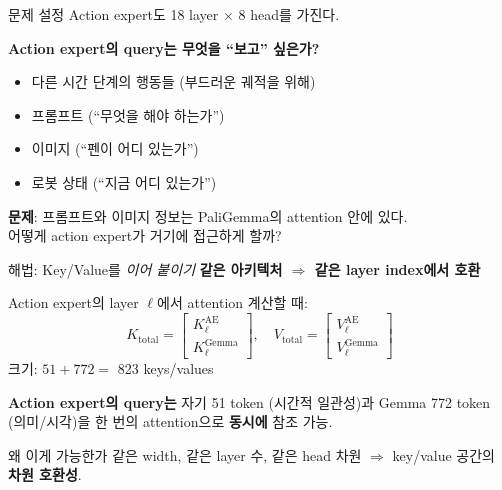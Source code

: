 \documentclass[aspectratio=169,10pt]{beamer}
\begin{document}
\begin{frame}{문제 설정}
Action expert도 18 layer $\times$ 8 head를 가진다.

\vspace{0.5em}
\textbf{Action expert의 query는 무엇을 ``보고'' 싶은가?}
\begin{itemize}
  \item 다른 시간 단계의 행동들 (부드러운 궤적을 위해)
  \item \alert{프롬프트} (``무엇을 해야 하는가'')
  \item \alert{이미지} (``펜이 어디 있는가'')
  \item \alert{로봇 상태} (``지금 어디 있는가'')
\end{itemize}

\vspace{0.8em}
\textbf{문제}: 프롬프트와 이미지 정보는 PaliGemma의 attention 안에 있다.\\
어떻게 action expert가 거기에 접근하게 할까?
\end{frame}

\begin{frame}{해법: Key/Value를 \textit{이어 붙이기}}
\textbf{같은 아키텍처 $\Rightarrow$ 같은 layer index에서 호환}

\vspace{0.3em}
Action expert의 layer $\ell$에서 attention 계산할 때:
\[
K_{\text{total}} = \begin{bmatrix} K^{\text{AE}}_\ell \\ K^{\text{Gemma}}_\ell \end{bmatrix}, \quad
V_{\text{total}} = \begin{bmatrix} V^{\text{AE}}_\ell \\ V^{\text{Gemma}}_\ell \end{bmatrix}
\]
크기: $51 + 772 = $ \alert{823 keys/values}

\vspace{0.4em}
\textbf{Action expert의 query는} 자기 51 token (시간적 일관성)과 Gemma 772 token (의미/시각)을 한 번의 attention으로 \textbf{동시에} 참조 가능.

\vspace{0.4em}
\begin{block}{왜 이게 가능한가}
같은 width, 같은 layer 수, 같은 head 차원 $\Rightarrow$ key/value 공간의 \textbf{차원 호환성}.
\end{block}
\end{frame}
\end{document}
